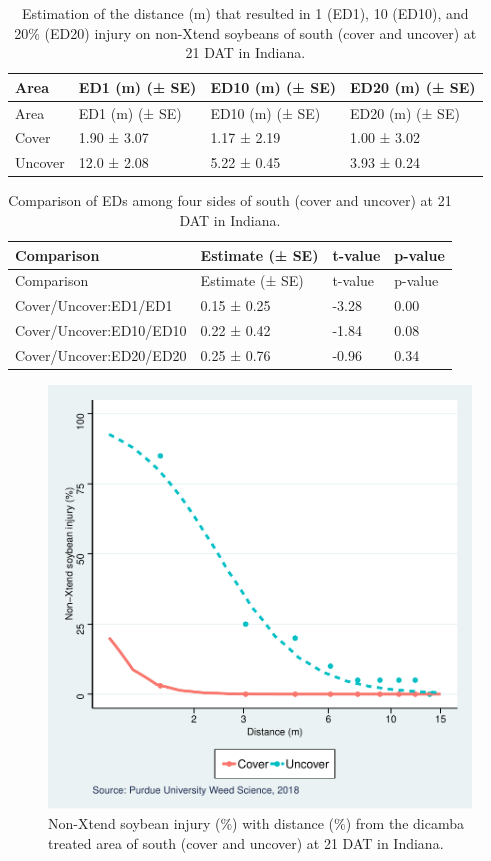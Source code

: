 \documentclass[]{article}
\begin{document}
\begin{longtable}[]{@{}llll@{}}
\caption{Estimation of the distance (m) that resulted in 1 (ED1), 10
(ED10), and 20\% (ED20) injury on non-Xtend soybeans of south (cover and
uncover) at 21 DAT in Indiana.}\tabularnewline
\toprule
Area & ED1 (m) (± SE) & ED10 (m) (± SE) & ED20 (m) (± SE)\tabularnewline
\midrule
\endfirsthead
\toprule
Area & ED1 (m) (± SE) & ED10 (m) (± SE) & ED20 (m) (± SE)\tabularnewline
\midrule
\endhead
Cover & 1.90 ± 3.07 & 1.17 ± 2.19 & 1.00 ± 3.02\tabularnewline
Uncover & 12.0 ± 2.08 & 5.22 ± 0.45 & 3.93 ± 0.24\tabularnewline
\bottomrule
\end{longtable}

\begin{longtable}[]{@{}llll@{}}
\caption{Comparison of EDs among four sides of south (cover and uncover)
at 21 DAT in Indiana.}\tabularnewline
\toprule
Comparison & Estimate (± SE) & t-value & p-value\tabularnewline
\midrule
\endfirsthead
\toprule
Comparison & Estimate (± SE) & t-value & p-value\tabularnewline
\midrule
\endhead
Cover/Uncover:ED1/ED1 & 0.15 ± 0.25 & -3.28 & 0.00\tabularnewline
Cover/Uncover:ED10/ED10 & 0.22 ± 0.42 & -1.84 & 0.08\tabularnewline
Cover/Uncover:ED20/ED20 & 0.25 ± 0.76 & -0.96 & 0.34\tabularnewline
\bottomrule
\end{longtable}

\begin{figure}
\centering
\includegraphics{Report_Dicamba_study_files/figure-latex/IN21S2Plot-1.pdf}
\caption{Non-Xtend soybean injury (\%) with distance (\%) from the
dicamba treated area of south (cover and uncover) at 21 DAT in Indiana.}
\end{figure}
\end{document}
